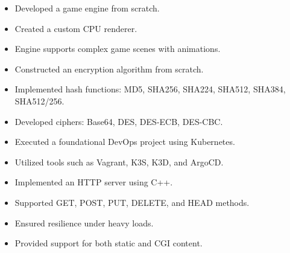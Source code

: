 
\begin{multicols}{2} %
    \begin{itemize}
        \item Developed a game engine from scratch.
        \item Created a custom CPU renderer.
        \item Engine supports complex game scenes with animations.
    \end{itemize}

    \begin{itemize}
        \item Constructed an encryption algorithm from scratch.
        \item Implemented hash functions: MD5, SHA256, SHA224, SHA512, SHA384, SHA512/256.
        \item Developed ciphers: Base64, DES, DES-ECB, DES-CBC.
    \end{itemize}
    
    \begin{itemize}
        \item Executed a foundational DevOps project using Kubernetes.
        \item Utilized tools such as Vagrant, K3S, K3D, and ArgoCD.
    \end{itemize}
    
\columnbreak
    \begin{itemize}
        \item Implemented an HTTP server using C++.
        \item Supported GET, POST, PUT, DELETE, and HEAD methods.
        \item Ensured resilience under heavy loads.
        \item Provided support for both static and CGI content.
    \end{itemize}


\end{multicols}
